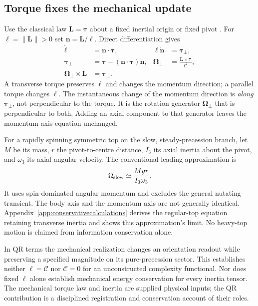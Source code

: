 \subsection{Torque fixes the mechanical update}
Use the classical law $\dot{\mathbf L}=\boldsymbol\tau$ about a fixed inertial origin or fixed pivot \citep{feynmanrotation}. For $\ell=\|\mathbf L\|>0$ set $\mathbf n=\mathbf L/\ell$. Direct differentiation gives
\begin{equation}
\begin{aligned}
\dot\ell&=\mathbf n\cdot\boldsymbol\tau, &
\ell\dot{\mathbf n}&=\boldsymbol\tau_\perp,\\
\boldsymbol\tau_\perp&=\boldsymbol\tau-(\mathbf n\cdot\boldsymbol\tau)\mathbf n, &
\boldsymbol\Omega_\perp&=\frac{\mathbf L\times\boldsymbol\tau}{\ell^2},\\
\boldsymbol\Omega_\perp\times\mathbf L&=\boldsymbol\tau_\perp.
\end{aligned}
\tag{GY5}\label{eq:torquedecomposition}
\end{equation}
A transverse torque preserves $\ell$ and changes the momentum direction; a parallel torque changes $\ell$. The instantaneous change of the momentum direction is \emph{along} $\boldsymbol\tau_\perp$, not perpendicular to the torque. It is the rotation generator $\boldsymbol\Omega_\perp$ that is perpendicular to both. Adding an axial component to that generator leaves the momentum-axis equation unchanged.

For a rapidly spinning symmetric top on the slow, steady-precession branch, let $M$ be its mass, $r$ the pivot-to-centre distance, $I_3$ its axial inertia about the pivot, and $\omega_3$ its axial angular velocity. The conventional leading approximation is
\[
\Omega_{\rm slow}\simeq\frac{Mgr}{I_3\omega_3}.
\]
It uses spin-dominated angular momentum and excludes the general nutating transient. The body axis and the momentum axis are not generally identical. Appendix~\ref{app:conservativecalculations} derives the regular-top equation retaining transverse inertia and shows this approximation's limit. No heavy-top motion is claimed from information conservation alone.

In QR terms the mechanical realization changes an orientation readout while preserving a specified magnitude on its pure-precession sector. This establishes neither $\ell=\mathcal C$ nor $\dot{\mathcal C}=0$ for an unconstructed complexity functional. Nor does fixed $\ell$ alone establish mechanical energy conservation for every inertia tensor. The mechanical torque law and inertia are supplied physical inputs; the QR contribution is a disciplined registration and conservation account of their roles.
\endgroup
\setcounter{section}{37}
